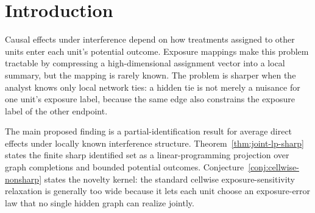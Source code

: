 \documentclass[11pt]{article}
\theoremstyle{definition}
\theoremstyle{plain}
\theoremstyle{remark}
\begin{document}
\begin{abstract}
Network-interference analyses often specify a low-dimensional exposure mapping, but in many applications only the local neighborhood of each unit is known.  Recent work gives sharp bounds for misspecified exposure mappings by bounding unitwise exposure propensities, and separate work studies bias or robust estimation when candidate networks are misspecified.  This proposal asks whether sharp partial identification of an average direct treatment effect changes when hidden exposure errors must arise from one shared graph completion rather than from independent unitwise sensitivity perturbations.  The routine theorem is a finite sharpness statement: the identified set is the projection of a graph-completion linear program.  The flagship conjecture is that the usual cellwise propensity-ratio relaxation can be strictly nonsharp because one hidden edge simultaneously constrains the exposure labels of both endpoints.  Resolving the conjecture would turn ``local network knowledge'' into testable compatibility inequalities for network exposure sensitivity analysis.
\end{abstract}

\section{Introduction}
Causal effects under interference depend on how treatments assigned to other units enter each unit's potential outcome.  Exposure mappings make this problem tractable by compressing a high-dimensional assignment vector into a local summary, but the mapping is rarely known.  The problem is sharper when the analyst knows only local network ties: a hidden tie is not merely a nuisance for one unit's exposure label, because the same edge also constrains the exposure label of the other endpoint.

The main proposed finding is a partial-identification result for average direct effects under locally known interference structure.  Theorem~\ref{thm:joint-lp-sharp} states the finite sharp identified set as a linear-programming projection over graph completions and bounded potential outcomes.  Conjecture~\ref{conj:cellwise-nonsharp} states the novelty kernel: the standard cellwise exposure-sensitivity relaxation is generally too wide because it lets each unit choose an exposure-error law that no single hidden graph can realize jointly.
\end{document}
